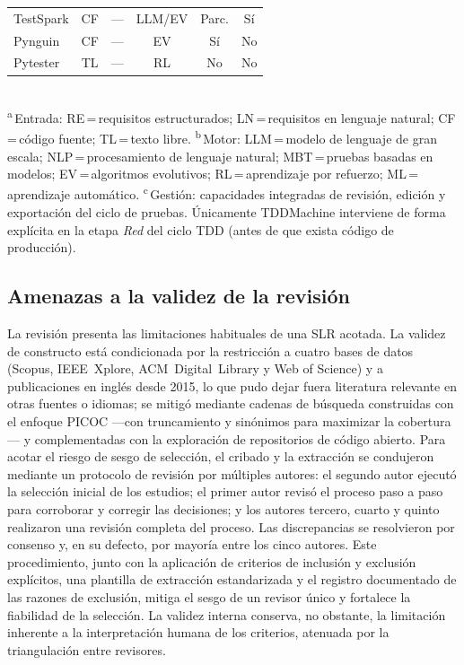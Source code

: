 \documentclass[10pt,journal,twoside,letterpaper]{IEEEtran}
\begin{document}
\begin{table}[!tb]
\begin{tabular}{@{}lccccc@{}}
            TestSpark \cite{sapozhnikov2024testspark}   & CF & ---   & LLM/EV & Parc. & Sí \\
            Pynguin \cite{lukasczyk2022pynguin}         & CF & ---   & EV    & Sí   & No \\
            Pytester \cite{takerngsaksiri2025pytester}  & TL & ---   & RL    & No   & No \\
            \bottomrule
        \end{tabular}
        \\[3pt]
        {\footnotesize \textsuperscript{a}\,Entrada: RE\,=\,requisitos estructurados; LN\,=\,requisitos en lenguaje natural; CF\,=\,código fuente; TL\,=\,texto libre. \textsuperscript{b}\,Motor: LLM\,=\,modelo de lenguaje de gran escala; NLP\,=\,procesamiento de lenguaje natural; MBT\,=\,pruebas basadas en modelos; EV\,=\,algoritmos evolutivos; RL\,=\,aprendizaje por refuerzo; ML\,=\,aprendizaje automático. \textsuperscript{c}\,Gestión: capacidades integradas de revisión, edición y exportación del ciclo de pruebas. Únicamente TDDMachine interviene de forma explícita en la etapa \emph{Red} del ciclo TDD (antes de que exista código de producción).}
    \end{table}
    
    \subsection{Amenazas a la validez de la revisión}
    \label{subsec:amenazas}
    
    La revisión presenta las limitaciones habituales de una SLR acotada. La validez de constructo está condicionada por la restricción a cuatro bases de datos (Scopus, IEEE~Xplore, ACM~Digital~Library y Web of Science) y a publicaciones en inglés desde 2015, lo que pudo dejar fuera literatura relevante en otras fuentes o idiomas; se mitigó mediante cadenas de búsqueda construidas con el enfoque PICOC ---con truncamiento y sinónimos para maximizar la cobertura--- y complementadas con la exploración de repositorios de código abierto. Para acotar el riesgo de sesgo de selección, el cribado y la extracción se condujeron mediante un protocolo de revisión por múltiples autores: el segundo autor ejecutó la selección inicial de los estudios; el primer autor revisó el proceso paso a paso para corroborar y corregir las decisiones; y los autores tercero, cuarto y quinto realizaron una revisión completa del proceso. Las discrepancias se resolvieron por consenso y, en su defecto, por mayoría entre los cinco autores. Este procedimiento, junto con la aplicación de criterios de inclusión y exclusión explícitos, una plantilla de extracción estandarizada y el registro documentado de las razones de exclusión, mitiga el sesgo de un revisor único y fortalece la fiabilidad de la selección. La validez interna conserva, no obstante, la limitación inherente a la interpretación humana de los criterios, atenuada por la triangulación entre revisores.
    
\end{document}

